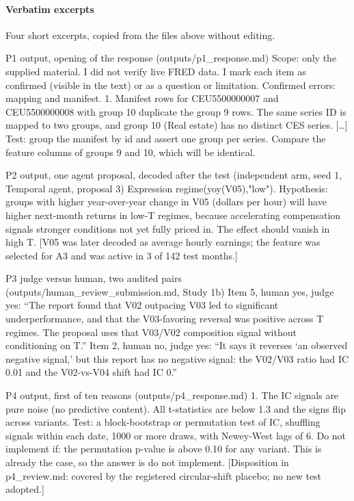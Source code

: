 \paragraph{Verbatim excerpts} Four short excerpts, copied from the files above without editing.
\begin{promptbox}{P1 output, opening of the response (outputs/p1\_response.md)}
Scope: only the supplied material. I did not verify live FRED data. I mark each item as confirmed (visible in the text) or as a question or limitation. Confirmed errors: mapping and manifest. 1. Manifest rows for CEU5500000007 and CEU5500000008 with group 10 duplicate the group 9 rows. The same series ID is mapped to two groups, and group 10 (Real estate) has no distinct CES series. [\ldots] Test: group the manifest by id and assert one group per series. Compare the feature columns of groups 9 and 10, which will be identical.
\end{promptbox}
\begin{promptbox}{P2 output, one agent proposal, decoded after the test (independent arm, seed 1, Temporal agent, proposal 3)}
Expression regime(yoy(V05),"low"). Hypothesis: groups with higher year-over-year change in V05 (dollars per hour) will have higher next-month returns in low-T regimes, because accelerating compensation signals stronger conditions not yet fully priced in. The effect should vanish in high T. [V05 was later decoded as average hourly earnings; the feature was selected for A3 and was active in 3 of 142 test months.] %
\end{promptbox}
\begin{promptbox}{P3 judge versus human, two audited pairs (outputs/human\_review\_submission.md, Study 1b)}
Item 5, human yes, judge yes: ``The report found that V02 outpacing V03 led to significant underperformance, and that the V03-favoring reversal was positive across T regimes. The proposal uses that V03/V02 composition signal without conditioning on T.'' Item 2, human no, judge yes: ``It says it reverses `an observed negative signal,' but this report has no negative signal: the V02/V03 ratio had IC 0.01 and the V02-vs-V04 shift had IC 0.''
\end{promptbox}
\begin{promptbox}{P4 output, first of ten reasons (outputs/p4\_response.md)}
1. The IC signals are pure noise (no predictive content). All t-statistics are below 1.3 and the signs flip across variants. Test: a block-bootstrap or permutation test of IC, shuffling signals within each date, 1000 or more draws, with Newey-West lags of 6. Do not implement if: the permutation p-value is above 0.10 for any variant. This is already the case, so the answer is do not implement. [Disposition in p4\_review.md: covered by the registered circular-shift placebo; no new test adopted.]
\end{promptbox}

